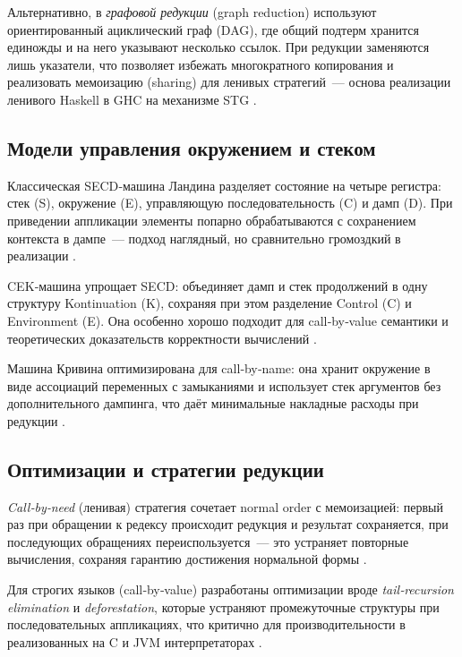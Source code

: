 Альтернативно, в \emph{графовой редукции} (graph reduction) используют ориентированный ациклический граф (DAG), где общий подтерм хранится единожды и на него указывают несколько ссылок. При редукции заменяются лишь указатели, что позволяет избежать многократного копирования и реализовать мемоизацию (sharing) для ленивых стратегий — основа реализации ленивого Haskell в GHC на механизме STG \cite{PeytonJones1992}\cite{Barendregt1993}.  

\subsection{Модели управления окружением и стеком}
Классическая \textsc{SECD}‑машина Ландина разделяет состояние на четыре регистра: стек (S), окружение (E), управляющую последовательность (C) и дамп (D). При приведении аппликации элементы попарно обрабатываются с сохранением контекста в дампе — подход наглядный, но сравнительно громоздкий в реализации \cite{Landin1964}\cite{Felleisen1987}.  

\textsc{CEK}‑машина упрощает SECD: объединяет дамп и стек продолжений в одну структуру Kontinuation (K), сохраняя при этом разделение Control (C) и Environment (E). Она особенно хорошо подходит для call‑by‑value семантики и теоретических доказательств корректности вычислений \cite{Felleisen1987}\cite{Plotkin1975}.  

Машина Кривина оптимизирована для call‑by‑name: она хранит окружение в виде ассоциаций переменных с замыканиями и использует стек аргументов без дополнительного дампинга, что даёт минимальные накладные расходы при редукции \cite{Krivine2007}\cite{Barendregt1984}.  

\subsection{Оптимизации и стратегии редукции}
\emph{Call‑by‑need} (ленивая) стратегия сочетает normal order с мемоизацией: первый раз при обращении к редексу происходит редукция и результат сохраняется, при последующих обращениях переиспользуется — это устраняет повторные вычисления, сохраняя гарантию достижения нормальной формы \cite{Barendregt1993}\cite{Wadler1987}.  

Для строгих языков (call‑by‑value) разработаны оптимизации вроде \emph{tail‑recursion elimination} и \emph{deforestation}, которые устраняют промежуточные структуры при последовательных аппликациях, что критично для производительности в реализованных на C и JVM интерпретаторах \cite{PeytonJones1992}\cite{Wadler1990}.  


